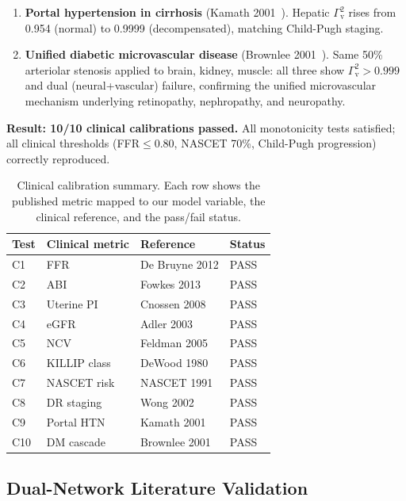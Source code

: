 ﻿\documentclass[aps,pre,twocolumn,superscriptaddress,floatfix]{revtex4-2}
\newcommand{\Gv}{\Gamma_{\mathrm{v}}}
\begin{document}
\begin{enumerate}
  \item[\textbf{C9.}] \textbf{Portal hypertension in cirrhosis}
    (Kamath 2001~\cite{Kamath2001}).
    Hepatic $\Gv^2$ rises from 0.954 (normal) to
    0.9999 (decompensated), matching Child-Pugh staging.

  \item[\textbf{C10.}] \textbf{Unified diabetic microvascular disease}
    (Brownlee 2001~\cite{brownlee2001}).
    Same 50\% arteriolar stenosis applied to brain, kidney, muscle:
    all three show $\Gv^2 > 0.999$ and dual (neural+vascular)
    failure, confirming the unified microvascular mechanism
    underlying retinopathy, nephropathy, and neuropathy.
\end{enumerate}

\textbf{Result: 10/10 clinical calibrations passed.}
All monotonicity tests satisfied; all clinical thresholds
(FFR$\le 0.80$, NASCET 70\%, Child-Pugh progression)
correctly reproduced.

\begin{table}[htbp]
\caption{Clinical calibration summary.
Each row shows the published metric mapped to
our model variable, the clinical reference, and
the pass/fail status.}
\label{tab:clinical}
\begin{ruledtabular}
\begin{tabular}{llll}
Test & Clinical metric & Reference & Status \\
\hline
C1  & FFR            & De Bruyne 2012    & PASS \\
C2  & ABI            & Fowkes 2013       & PASS \\
C3  & Uterine PI     & Cnossen 2008      & PASS \\
C4  & eGFR           & Adler 2003        & PASS \\
C5  & NCV            & Feldman 2005      & PASS \\
C6  & KILLIP class   & DeWood 1980       & PASS \\
C7  & NASCET risk    & NASCET 1991       & PASS \\
C8  & DR staging     & Wong 2002         & PASS \\
C9  & Portal HTN     & Kamath 2001       & PASS \\
C10 & DM cascade     & Brownlee 2001     & PASS \\
\end{tabular}
\end{ruledtabular}
\end{table}


\subsection{Dual-Network Literature Validation}\label{sec:literature}
\end{document}
